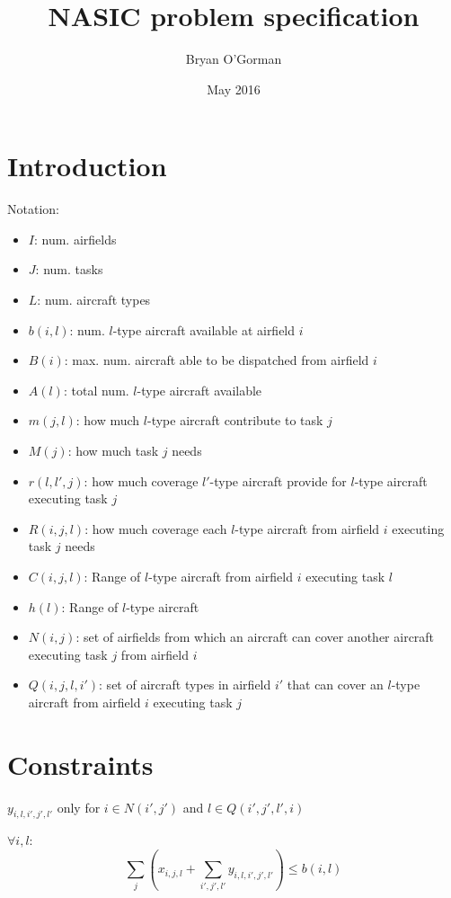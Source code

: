 \documentclass{article}
\title{NASIC problem specification}
\author{Bryan O'Gorman}
\date{May 2016}
\begin{document}
\maketitle

\section{Introduction}
Notation:
\begin{itemize}
    \item $I$: num. airfields
    \item $J$: num. tasks
    \item $L$: num. aircraft types
    \item $b(i, l)$: num. $l$-type aircraft available at airfield $i$
    \item $B(i)$: max. num. aircraft able to be dispatched from airfield $i$
    \item $A(l)$: total num. $l$-type aircraft available
    \item $m(j, l)$: how much $l$-type aircraft contribute to task $j$
    \item $M(j)$: how much task $j$ needs
    \item $r(l, l', j)$: how much coverage $l'$-type aircraft provide for $l$-type aircraft executing task $j$
    \item $R(i, j, l)$: how much coverage each $l$-type aircraft from airfield $i$ executing task $j$ needs
    \item $C(i, j, l)$: Range of $l$-type aircraft from airfield $i$ executing task $l$
    \item $h(l)$: Range of $l$-type aircraft
    \item $N(i, j)$: set of airfields from which an aircraft can cover another aircraft executing task $j$ from airfield $i$  
    \item $Q(i, j, l, i')$: set of aircraft types in airfield $i'$ that can cover an $l$-type aircraft from airfield $i$ executing task $j$
\end{itemize}


\section{Constraints}

$y_{i, l, i', j', l'}$ only for $i \in N(i', j')$ and $l \in Q(i', j', l', i)$

$\forall i, l$: 
\begin{equation}
\sum_j \left(x_{i, j, l} + \sum_{i', j', l'}  y_{i, l, i', j', l'}\right) \leq b(i, l)
\end{equation}
\end{document}

